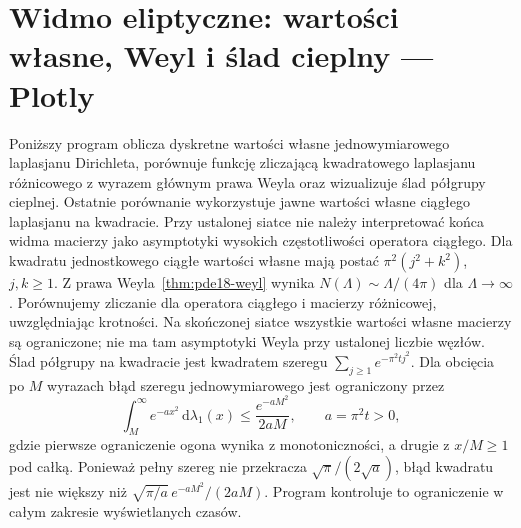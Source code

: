 \section{Widmo eliptyczne: wartości własne, Weyl i ślad cieplny — Plotly}
\label{sec:pde18-code}
Poniższy program oblicza dyskretne wartości własne jednowymiarowego
laplasjanu Dirichleta, porównuje funkcję zliczającą kwadratowego
laplasjanu różnicowego z wyrazem głównym prawa Weyla oraz
wizualizuje ślad półgrupy cieplnej. Ostatnie porównanie wykorzystuje
jawne wartości własne ciągłego laplasjanu na kwadracie.
Przy ustalonej siatce nie należy interpretować końca widma
macierzy jako asymptotyki wysokich częstotliwości operatora ciągłego.
Dla kwadratu jednostkowego ciągłe wartości własne
mają postać $\pi^2(j^2+k^2)$, $j,k\ge1$.
Z prawa Weyla~\ref{thm:pde18-weyl} wynika
$N(\Lambda)\sim\Lambda/(4\pi)$ dla $\Lambda\to\infty$.
Porównujemy zliczanie dla operatora ciągłego
i macierzy różnicowej, uwzględniając krotności.
Na skończonej siatce wszystkie wartości własne
macierzy są ograniczone; nie ma tam asymptotyki Weyla
przy ustalonej liczbie węzłów.
Ślad półgrupy na kwadracie jest kwadratem szeregu
$\sum_{j\ge1}e^{-\pi^2tj^2}$.
Dla obcięcia po $M$ wyrazach błąd szeregu
jednowymiarowego jest ograniczony przez
\[
 \int_M^\infty e^{-a x^2}\,\mathrm d\lambda_1(x)
 \le\frac{e^{-aM^2}}{2aM},\qquad a=\pi^2t>0,
\]
gdzie pierwsze ograniczenie ogona wynika z monotoniczności,
a drugie z $x/M\ge1$ pod całką.
Ponieważ pełny szereg nie przekracza
$\sqrt{\pi}/(2\sqrt a)$, błąd kwadratu jest
nie większy niż $\sqrt{\pi/a}\,e^{-aM^2}/(2aM)$.
Program kontroluje to ograniczenie w całym
zakresie wyświetlanych czasów.
